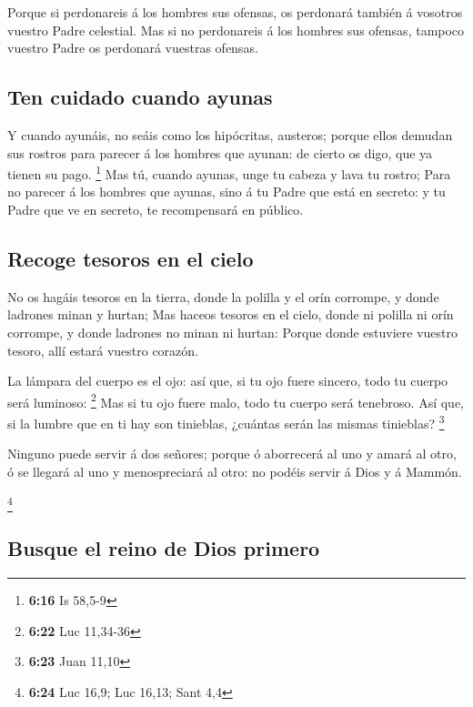  Porque si perdonareis á los hombres sus ofensas, os
perdonará también á vosotros vuestro Padre celestial. 
Mas si no perdonareis á los hombres sus ofensas, tampoco vuestro Padre
os perdonará vuestras ofensas.

\hypertarget{ten-cuidado-cuando-ayunas}{%
\subsection{Ten cuidado cuando ayunas}\label{ten-cuidado-cuando-ayunas}}

 Y cuando ayunáis, no seáis como los hipócritas,
austeros; porque ellos demudan sus rostros para parecer á los hombres
que ayunan: de cierto os digo, que ya tienen su pago. \footnote{\textbf{6:16}
  Is 58,5-9}  Mas tú, cuando ayunas, unge tu cabeza y
lava tu rostro;  Para no parecer á los hombres que
ayunas, sino á tu Padre que está en secreto: y tu Padre que ve en
secreto, te recompensará en público.

\hypertarget{recoge-tesoros-en-el-cielo}{%
\subsection{Recoge tesoros en el
cielo}\label{recoge-tesoros-en-el-cielo}}

 No os hagáis tesoros en la tierra, donde la polilla y el
orín corrompe, y donde ladrones minan y hurtan;  Mas
haceos tesoros en el cielo, donde ni polilla ni orín corrompe, y donde
ladrones no minan ni hurtan:  Porque donde estuviere
vuestro tesoro, allí estará vuestro corazón.

 La lámpara del cuerpo es el ojo: así que, si tu ojo
fuere sincero, todo tu cuerpo será luminoso: \footnote{\textbf{6:22} Luc
  11,34-36}  Mas si tu ojo fuere malo, todo tu cuerpo
será tenebroso. Así que, si la lumbre que en ti hay son tinieblas,
¿cuántas serán las mismas tinieblas? \footnote{\textbf{6:23} Juan 11,10}

 Ninguno puede servir á dos señores; porque ó aborrecerá
al uno y amará al otro, ó se llegará al uno y menospreciará al otro: no
podéis servir á Dios y á Mammón.

\footnote{\textbf{6:24} Luc 16,9; Luc 16,13; Sant 4,4}

\hypertarget{busque-el-reino-de-dios-primero}{%
\subsection{Busque el reino de Dios
primero}\label{busque-el-reino-de-dios-primero}}

